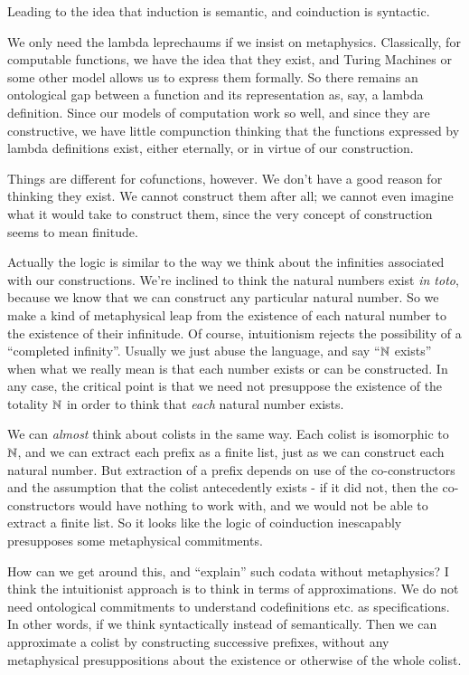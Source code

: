 \documentclass{article}
\begin{document}
Leading to the idea that induction is semantic, and coinduction is
syntactic.

We only need the lambda leprechaums if we insist on metaphysics.
Classically, for computable functions, we have the idea that they
exist, and Turing Machines or some other model allows us to express
them formally. So there remains an ontological gap between a function
and its representation as, say, a lambda definition. Since our models
of computation work so well, and since they are constructive, we have
little compunction thinking that the functions expressed by lambda
definitions exist, either eternally, or in virtue of our construction.

Things are different for cofunctions, however. We don't have a good
reason for thinking they exist. We cannot construct them after all; we
cannot even imagine what it would take to construct them, since the
very concept of construction seems to mean finitude.

Actually the logic is similar to the way we think about the infinities
associated with our constructions. We're inclined to think the natural
numbers exist \textit{in toto}, because we know that we can construct
any particular natural number. So we make a kind of metaphysical leap
from the existence of each natural number to the existence of their
infinitude. Of course, intuitionism rejects the possibility of a
``completed infinity''. Usually we just abuse the language, and say
``\(\mathbb{N}\) exists'' when what we really mean is that each number
exists or can be constructed. In any case, the critical point is that
we need not presuppose the existence of the totality \(\mathbb{N}\) in order
to think that \textit{each} natural number exists.

We can \textit{almost} think about colists in the same way. Each
colist is isomorphic to \(\mathbb{N}\), and we can extract each prefix as a
finite list, just as we can construct each natural number. But
extraction of a prefix depends on use of the co-constructors and the
assumption that the colist antecedently exists - if it did not, then
the co-constructors would have nothing to work with, and we would not
be able to extract a finite list. So it looks like the logic of
coinduction inescapably presupposes some metaphysical commitments.

How can we get around this, and ``explain'' such codata without
metaphysics? I think the intuitionist approach is to think in terms of
approximations. We do not need ontological commitments to understand
codefinitions etc. as specifications. In other words, if we think
syntactically instead of semantically. Then we can approximate a
colist by constructing successive prefixes, without any metaphysical
presuppositions about the existence or otherwise of the whole colist.
\end{document}
